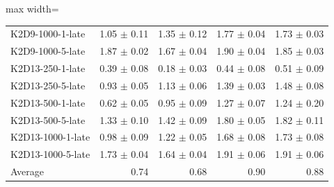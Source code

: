 \documentclass{article}
\begin{document}
\begin{table}[ht]
\begin{center}
\begin{small}
\begin{adjustbox}{max width=\columnwidth}
\begin{tabular}{l|rrrr}
K2D9-1000-1-late & 1.05 $\pm$ 0.11 & 1.35 $\pm$ 0.12 & 1.77 $\pm$ 0.04 & 1.73 $\pm$ 0.03\\
K2D9-1000-5-late & 1.87 $\pm$ 0.02 & 1.67 $\pm$ 0.04 & 1.90 $\pm$ 0.04 & 1.85 $\pm$ 0.03\\
K2D13-250-1-late & 0.39 $\pm$ 0.08 & 0.18 $\pm$ 0.03 & 0.44 $\pm$ 0.08 & 0.51 $\pm$ 0.09\\
K2D13-250-5-late & 0.93 $\pm$ 0.05 & 1.13 $\pm$ 0.06 & 1.39 $\pm$ 0.03 & 1.48 $\pm$ 0.08\\
K2D13-500-1-late & 0.62 $\pm$ 0.05 & 0.95 $\pm$ 0.09 & 1.27 $\pm$ 0.07 & 1.24 $\pm$ 0.20\\
K2D13-500-5-late & 1.33 $\pm$ 0.10 & 1.42 $\pm$ 0.09 & 1.80 $\pm$ 0.05 & 1.82 $\pm$ 0.11\\
K2D13-1000-1-late & 0.98 $\pm$ 0.09 & 1.22 $\pm$ 0.05 & 1.68 $\pm$ 0.08 & 1.73 $\pm$ 0.08\\
K2D13-1000-5-late & 1.73 $\pm$ 0.04 & 1.64 $\pm$ 0.04 & 1.91 $\pm$ 0.06 & 1.91 $\pm$ 0.06\\
\midrule
Average & 0.74 & 0.68 & 0.90 & 0.88\\
\end{tabular}
        \end{adjustbox}
    \end{small}
    \end{center}
    \vskip -0.1in
\end{table}
\end{document}
